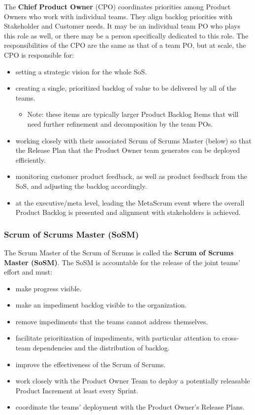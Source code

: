 \documentclass[12pt,a4paper,parskip=full]{scrartcl}
\begin{document}
The \textbf{Chief Product Owner} (CPO) coordinates priorities among Product Owners who work with individual teams. They align backlog priorities with Stakeholder and Customer needs. It may be an individual team PO who plays this role as well, or there may be a person specifically dedicated to this role. The responsibilities of the CPO are the same as that of a team PO, but at scale, the CPO is responsible for:

\begin{itemize}
	\item setting a strategic vision for the whole SoS.
	\item creating a single, prioritized backlog of value to be delivered by all of the teams.
	\begin{itemize}
		\item Note: these items are typically larger Product Backlog Items that will need further refinement and decomposition by the team POs.
	\end{itemize}
	\item working closely with their associated Scrum of Scrums Master (below) so that the Release Plan that the Product Owner team generates can be deployed efficiently.
	\item monitoring customer product feedback, as well as product feedback from the SoS, and adjusting the backlog accordingly.
	\item at the executive/meta level, leading the MetaScrum event where the overall Product Backlog is presented and alignment with stakeholders is achieved.
\end{itemize}



\subsubsection{Scrum of Scrums Master (SoSM)}

The Scrum Master of the Scrum of Scrums is called the \textbf{Scrum of Scrums Master (SoSM)}. The SoSM is accountable for the release of the joint teams' effort and must:

\begin{itemize}
	\item make progress visible.
	\item make an impediment backlog visible to the organization.
	\item remove impediments that the teams cannot address themselves.
	\item facilitate prioritization of impediments, with particular attention to cross-team dependencies and the distribution of backlog.
	\item improve the effectiveness of the Scrum of Scrums.
	\item work closely with the Product Owner Team to deploy a potentially releasable Product Increment at least every Sprint.
	\item coordinate the teams' deployment with the Product Owner's Release Plans.
\end{itemize}
\end{document}
